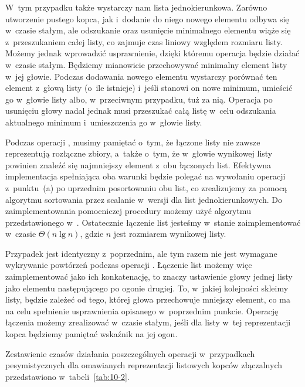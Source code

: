 \subproblem %
W~tym przypadku także wystarczy nam lista jednokierunkowa. Zarówno utworzenie pustego kopca, jak i~dodanie do niego nowego elementu odbywa się w~czasie stałym, ale odszukanie oraz usunięcie minimalnego elementu wiąże się z~przeszukaniem całej listy, co zajmuje czas liniowy względem rozmiaru listy. Możemy jednak wprowadzić usprawnienie, dzięki któremu operacja  będzie działać w~czasie stałym. Będziemy mianowicie przechowywać minimalny element listy w~jej głowie. Podczas dodawania nowego elementu wystarczy porównać ten element z~głową listy (o~ile istnieje) i~jeśli stanowi on nowe minimum, umieścić go w~głowie listy albo, w~przeciwnym przypadku, tuż za nią. Operacja  po usunięciu głowy nadal jednak musi przeszukać całą listę w~celu odszukania aktualnego minimum i~umieszczenia go w~głowie listy.

Podczas operacji , musimy pamiętać o~tym, że łączone listy nie zawsze reprezentują rozłączne zbiory, a~także o~tym, że w~głowie wynikowej listy powinien znaleźć się najmniejszy element z~obu łączonych list. Efektywna implementacja spełniająca oba warunki będzie polegać na wywołaniu operacji  z~punktu~(a) po uprzednim posortowaniu obu list, co zrealizujemy za pomocą algorytmu sortowania przez scalanie w~wersji dla list jednokierunkowych. Do zaimplementowania pomocniczej procedury  możemy użyć algorytmu przedstawionego w~. Ostatecznie łączenie list jesteśmy w~stanie zaimplementować w~czasie $\Theta(n\lg n)$, gdzie $n$ jest rozmiarem wynikowej listy.

\subproblem %
Przypadek jest identyczny z~poprzednim, ale tym razem nie jest wymagane wykrywanie powtórzeń podczas operacji . Łączenie list możemy więc zaimplementować jako ich konkatenację, to znaczy ustawienie głowy jednej listy jako elementu następującego po ogonie drugiej. To, w~jakiej kolejności skleimy listy, będzie zależeć od tego, której głowa przechowuje mniejszy element, co ma na celu spełnienie usprawnienia opisanego w~poprzednim punkcie. Operację łączenia możemy zrealizować w~czasie stałym, jeśli dla listy w~tej reprezentacji kopca będziemy pamiętać wskaźnik na jej ogon.

\bigskip
\noindent Zestawienie czasów działania poszczególnych operacji w~przypadkach pesymistycznych dla omawianych reprezentacji listowych kopców złączalnych przedstawiono w~tabeli~\ref{tab:10-2}.

